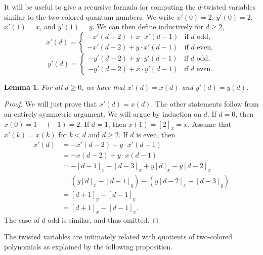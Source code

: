 \documentclass{amsart}
\newtheorem{lemma}[subsubsection]{Lemma}
\theoremstyle{definition}
\numberwithin{equation}{subsection}
\begin{document}
It will be useful to give a recursive formula for computing the $d$-twisted variables similar to the two-colored quantum numbers.
We write $x'(0) = 2$, $y'(0) = 2$, $x'(1) = x$, and $y'(1) = y$. We can then define inductively for $d \geq 2$,
\[ x'(d) = \begin{cases} -x'(d-2) + x \cdot x'(d-1) & \text{if } d \text{ odd}, \\ -x'(d-2) + y \cdot x'(d-1) & \text{if } d \text{ even},\end{cases}\]
\[ y'(d) = \begin{cases} -y'(d-2) + y \cdot y'(d-1) & \text{if } d \text{ odd}, \\ -y'(d-2) + x \cdot y'(d-1) & \text{if } d \text{ even}.\end{cases} \]

\begin{lemma}\label{lem:recursive_formula_for_twisted_vars}
    For all $d \geq 0$, we have that $x'(d) = x(d)$ and $y'(d) = y(d)$. 
\end{lemma}
\begin{proof}
    We will just prove that $x' (d) = x(d)$. The other statements follow from an entirely symmetric argument. We will argue by induction on $d$.
    If $d = 0$, then $x(0) = 1-(-1) = 2$. If $d=1$, then $x(1) = [2]_x = x$.
    Assume that $x' (k) = x(k)$ for $k < d$ and $d \geq 2$. 
    If $d$ is even, then
    \begin{align*}
        x'(d) &= -x' (d-2) + y \cdot x' (d-1) \\
        &= -x (d-2) + y \cdot x (d-1) \\
       &= -[d-1]_x - [d-3]_x + y [d]_x - y[d-2]_x \\
       &= (y[d]_x - [d-1]_y) - (y[d-2]_x - [d-3]_y) \\
       &= [d+1]_y - [d-1]_y \\
       &= [d+1]_x - [d-1]_x.
    \end{align*}
   The case of $d$ odd is similar, and thus omitted.
\end{proof}

The twisted variables are intimately related with quotients of two-colored polynomials as explained by the following proposition.
\end{document}
